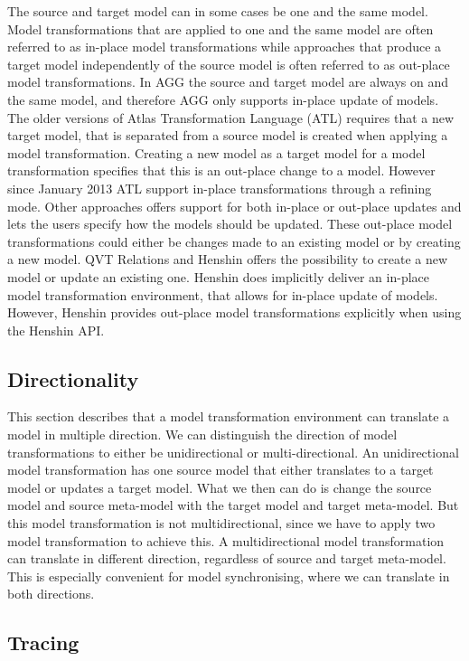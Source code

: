 The source and target model can in some cases be one and the same model.
Model transformations that are applied to one and the same model are often
referred to as in-place model transformations while approaches that produce a
target model independently of the source model is often referred to as
out-place model transformations. In AGG the source and target model are always
on and the same model, and therefore AGG only supports in-place update of
models. The older versions of Atlas Transformation Language (ATL) requires that
a new target model, that is separated from a source model is created when
applying a model transformation. Creating a new model as a target model for a
model transformation specifies that this is an out-place change to a model. However
since January 2013 ATL support in-place transformations through a refining
mode. Other approaches offers support for both in-place or out-place updates
and lets the users specify how the models should be updated. These out-place
model transformations could either be changes made to an existing model or by
creating a new model. QVT Relations and Henshin offers the possibility to create
a new model or update an existing one. Henshin does implicitly deliver an
in-place model transformation environment, that allows for in-place update of
models. However, Henshin provides out-place model transformations explicitly
when using the Henshin API.

\subsection{Directionality}

This section describes that a model transformation environment can translate a
model in multiple direction. We can distinguish the direction of model
transformations to either be unidirectional or multi-directional. An
unidirectional model transformation has one source model that either translates
to a target model or updates a target model. What we then can do is change the source
model and source meta-model with the target model and target meta-model. But
this model transformation is not multidirectional, since we have to apply two
model transformation to achieve this. A multidirectional model transformation
can translate in different direction, regardless of source and target
meta-model. This is especially convenient for model synchronising, where we can
translate in both directions. 

\subsection{Tracing}
\label{sec:tracing}

